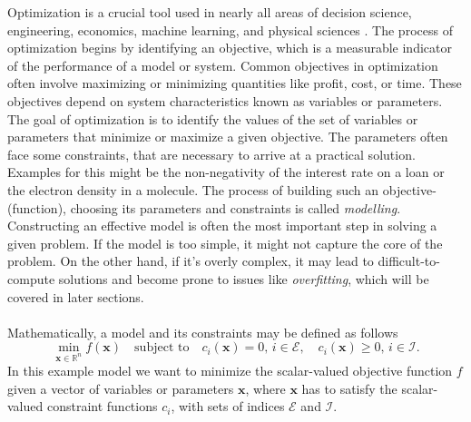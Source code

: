 Optimization is a crucial tool used in nearly all areas of decision science, engineering, economics, machine learning, and physical sciences \cite{nocedal2006numerical}.
The process of optimization begins by identifying an objective, which is a measurable indicator of the performance of a model or system. 
Common objectives in optimization often involve maximizing or minimizing quantities like profit, cost, or time.
These objectives depend on system characteristics known as variables or parameters.
The goal of optimization is to identify the values of the set of variables or parameters that minimize or maximize a given objective.
The parameters often face some constraints, that are necessary to arrive at a practical solution.
Examples for this might be the non-negativity of the interest rate on a loan or the electron
density in a molecule.\cite{nocedal2006numerical}
The process of building such an objective-(function), choosing its parameters and constraints is called \emph{modelling}.
Constructing an effective model is often the most important step in solving a given problem.
If the model is too simple, it might not capture the core of the problem.
On the other hand, if it's overly complex, it may lead to difficult-to-compute solutions and become prone to issues like \emph{overfitting},
which will be covered in later sections. \\\\
Mathematically, a model and its constraints may be defined as follows
\[
\min_{\mathbf{x} \in \mathbb{R}^{n}} f(\mathbf{x}) \quad \text{subject to} \quad
c_i(\mathbf{x}) = 0, \, i \in \mathcal{E}, \quad
c_i(\mathbf{x}) \geq 0, \, i \in \mathcal{I}.
\]
In this example model we want to minimize the scalar-valued objective function $f$ given a vector of variables or parameters $\mathbf{x}$,
where $\mathbf{x}$ has to satisfy the scalar-valued constraint functions $c_i$, with sets of indices $\mathcal{E}$ and $\mathcal{I}$.

